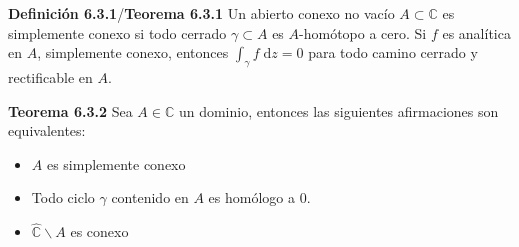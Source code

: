 \documentclass[a4paper, 11pt]{extarticle}
\newcommand{\tma}[1]{\textcolor{rojo}{\textbf{Teorema #1}}}
\newcommand{\defi}[1]{\textcolor{azul}{\textbf{Definición #1}}}
\begin{document}
\begin{multicols*}{2}
\defi{6.3.1}/\tma{6.3.1} Un abierto conexo no vacío \(A \subset \mathbb{C}\) es
simplemente conexo si todo cerrado \(\gamma \subset A\) es \(A\)-homótopo a
cero.
Si \(f\) es analítica en \(A\), simplemente conexo, entonces \(\int _\gamma
f \; \text{d} z = 0\) para todo camino cerrado y rectificable en \(A\).

\tma{6.3.2} Sea \(A \in \mathbb{C}\) un dominio, entonces las siguientes
afirmaciones son equivalentes:
\vspace{-1em}
\begin{itemize}
\item \(A\) es simplemente conexo
\item Todo ciclo \(\gamma\) contenido en \(A\) es homólogo a 0.
\item \(\hat{\mathbb{C}} \backslash A\) es conexo
\end{itemize}

\vspace{-1em}

\end{multicols*}
\end{document}

